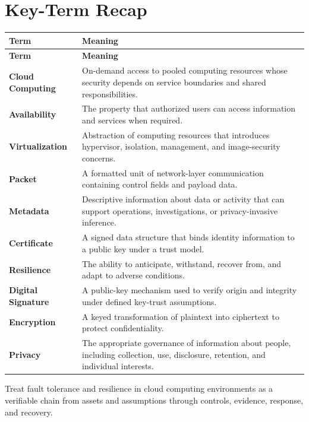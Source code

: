 \documentclass[11pt]{article}
\begin{document}
\section*{Key-Term Recap}
\begin{longtable}{>{\RaggedRight\arraybackslash}p{}>{\RaggedRight\arraybackslash}p{}}
\toprule\rowcolor{Navy}\color{white}\textbf{Term} & \color{white}\textbf{Meaning}\\\midrule
\endfirsthead
\toprule\rowcolor{Navy}\color{white}\textbf{Term} & \color{white}\textbf{Meaning}\\\midrule
\endhead
\textbf{Cloud Computing} & On-demand access to pooled computing resources whose security depends on service boundaries and shared responsibilities. \\\midrule
\textbf{Availability} & The property that authorized users can access information and services when required. \\\midrule
\textbf{Virtualization} & Abstraction of computing resources that introduces hypervisor, isolation, management, and image-security concerns. \\\midrule
\textbf{Packet} & A formatted unit of network-layer communication containing control fields and payload data. \\\midrule
\textbf{Metadata} & Descriptive information about data or activity that can support operations, investigations, or privacy-invasive inference. \\\midrule
\textbf{Certificate} & A signed data structure that binds identity information to a public key under a trust model. \\\midrule
\textbf{Resilience} & The ability to anticipate, withstand, recover from, and adapt to adverse conditions. \\\midrule
\textbf{Digital Signature} & A public-key mechanism used to verify origin and integrity under defined key-trust assumptions. \\\midrule
\textbf{Encryption} & A keyed transformation of plaintext into ciphertext to protect confidentiality. \\\midrule
\textbf{Privacy} & The appropriate governance of information about people, including collection, use, disclosure, retention, and individual interests. \\\midrule
\bottomrule
\end{longtable}
\begin{takeawaybox}
Treat fault tolerance and resilience in cloud computing environments as a verifiable chain from assets and assumptions through controls, evidence, response, and recovery.
\end{takeawaybox}
\end{document}
